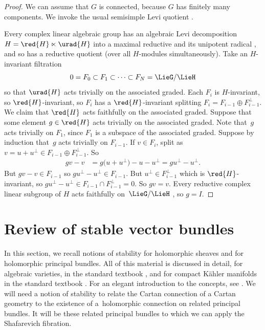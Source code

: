 \documentclass[10pt,a4paper]{amsart}
\numberwithin{equation}{section}
\begin{document}
\begin{proof}
We can assume that $G$ is connected, because $G$ has finitely many components.
We invoke the usual semisimple Levi quotient \cite[p. 20]{Vinberg:1994}.

Every complex linear algebraic group has an algebraic Levi decomposition $H = \red{H} \ltimes \urad{H}$ into a maximal reductive and its unipotent radical \cite[Theorem 4.3]{Hochschild:1981}, and so has a reductive quotient (over all $H$-modules simultaneously).
Take an $H$-invariant filtration \[0 = F_0 \subset F_1 \subset \cdots
 \subset F_N = \LieG/\LieH\] so that $\urad{H}$ acts trivially on the associated graded.
Each $F_i$ is $H$-invariant, so $\red{H}$-invariant, so $F_i$ has a $\red{H}$-invariant splitting $F_i=F_{i-1} \oplus F_{i-1}^{\perp}$.
We claim that $\red{H}$ acts faithfully on the associated graded.
Suppose that some element $g \in \red{H}$ acts trivially on the associated graded.
Note that~$g$ acts trivially on $F_1$, since $F_1$ is a subspace of the associated graded.
Suppose by induction that~$g$ acts trivially on $F_{i-1}$.
If $v \in F_i$, split as $v=u+u^{\perp}\in F_{i-1}\oplus F_{i-1}^{\perp}$.
So
\begin{align*}
gv-v
&=
g\bigl(u+u^{\perp}\bigr)-u-u^{\perp}=
gu^{\perp}-u^{\perp}.
\end{align*}
But $gv-v \in F_{i-1}$ so $gu^{\perp}-u^{\perp} \in F_{i-1}$.
But $u^{\perp} \in F_{i-1}^{\perp}$ which is $\red{H}$-invariant, so $gu^{\perp}-u^{\perp} \in F_{i-1} \cap F_{i-1}^{\perp}=0$.
So $gv = v$.
Every reductive complex linear subgroup of $H$ acts faithfully on~$\LieG/\LieH$ \cite[Lemma~6.1]{McKay2013}, so $g = I$.
\end{proof}

\section{Review of stable vector bundles}\label{section:stability}

In this section, we recall notions of stability for holomorphic sheaves and for holomorphic principal bundles.
All of this material is discussed in detail, for algebraic varieties, in the standard textbook \cite[Chapter 1]{Huybrechts/Lehn:2010}, and for compact K\"ahler manifolds in the standard textbook \cite[Chapter V, Section 7]{Kobayashi:1987}.
For an elegant introduction to the concepts, see \cite[Chapter 7]{Atiyah.Bott:1983}. We will need a notion of stability to relate the Cartan connection of a Cartan
geometry to the existence of a~holomorphic connection on related principal bundles. It will be these
related principal bundles to which we can apply the Shafarevich fibration.
\end{document}
